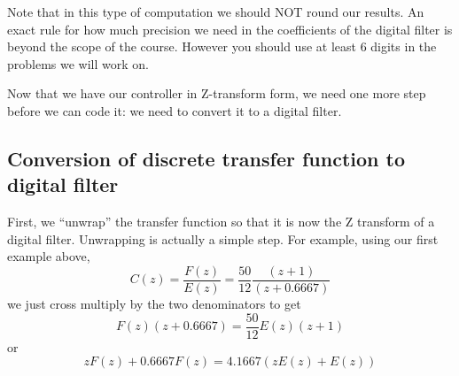 %
%
%
%
%
%
%
%
%
%
%
%
%
%
%
%
%
%


Note that in this type of computation we should NOT round our results.  An exact rule for how
much precision we need in the coefficients of the digital filter is beyond the scope of the
course.  However you should use at least 6 digits in the problems we will work on.

Now that we have our controller in Z-transform form, we need one more step before we can code it: we need to convert it to a digital filter.

\subsection{Conversion of discrete transfer function to digital filter}

First, we ``unwrap'' the transfer function so that it is now the Z transform of a digital filter.  Unwrapping is actually a simple step.  For example, using our first example above,
\[
C(z) = \frac{F(z)}{E(z)} = \frac{50}{12}\frac{(z+1)}{(z+0.6667)}
\]
we just cross multiply by the two denominators to get
\[
F(z) (z+0.6667) = \frac{50}{12} E(z) (z+1)
\]
or
\[
zF(z)+0.6667F(z) = 4.1667 (z E(z) + E(z))
\]

